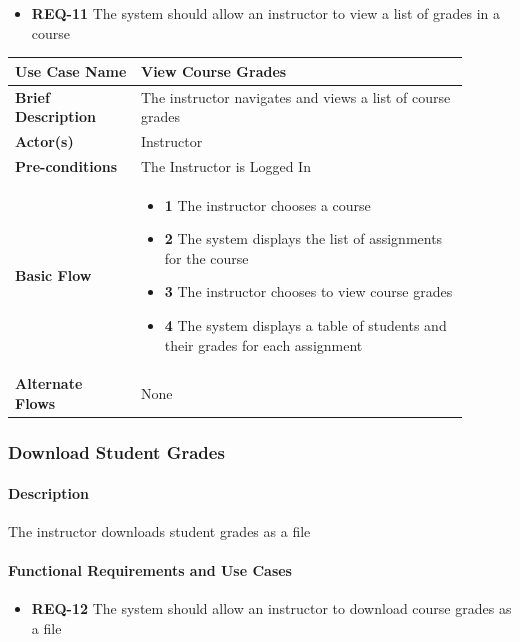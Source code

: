 \documentclass{article}
\begin{document}
\begin{itemize}
  \item\textbf{REQ-11} The system should allow an instructor to view a list of grades in a course
\end{itemize}

\vspace{0.2in}

\begin{tabular}{| p{0.25\linewidth} | p{0.65\linewidth} |}
  \hline
  \textbf{Use Case Name} & View Course Grades \\
  \hline
  \textbf{Brief Description} & The instructor navigates and views a list of course grades \\
  \hline
  \textbf{Actor(s)} & Instructor \\
  \hline
  \textbf{Pre-conditions} & The Instructor is Logged In\\
  \hline
  \textbf{Basic Flow} & \begin{itemize}
    \item[] \textbf{1} The instructor chooses a course
    \item[] \textbf{2} The system displays the list of assignments for the course
    \item[] \textbf{3} The instructor chooses to view course grades
    \item[] \textbf{4} The system displays a table of students and their grades for each assignment
  \end{itemize}\\
  \hline
  \textbf{Alternate Flows} & None\\
  \hline
\end{tabular}

\subsubsection{Download Student Grades}

\paragraph{Description} The instructor downloads student grades as a file

\paragraph{Functional Requirements and Use Cases}

\begin{itemize}
  \item \textbf{REQ-12} The system should allow an instructor to download course grades as a file
\end{itemize}
\end{document}
